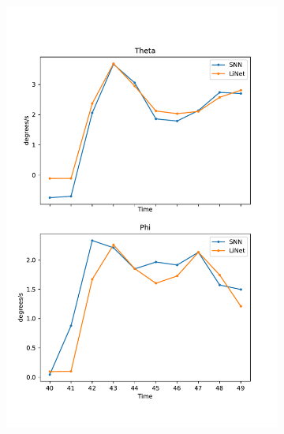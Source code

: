 \documentclass [MS] {UCLAthesis}
\begin{document}
\begin{figure}
\begin{subfigure}[b]{0.2\textwidth}
        \caption{}
        \label{fig:saccade_human_vel_normal}
    \end{subfigure}
    \hfill
    \begin{subfigure}[b]{0.2\textwidth}
        \centering
        \includegraphics[width=\textwidth]{saccade_human_vel_delta}
        \caption{}
        \label{fig:saccade_human_vel_delta}
    \end{subfigure}

    \caption[]{}
    \label{fig:saccade_vel}
\end{figure}
\end{document}
